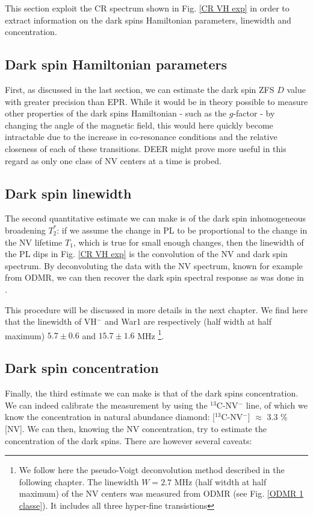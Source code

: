 \documentclass[a4paper, 11pt]{report}
\begin{document}
This section exploit the CR spectrum shown in Fig. \ref{CR VH exp} in order to extract information on the dark spins Hamiltonian parameters, linewidth and concentration.

\subsection{Dark spin Hamiltonian parameters}

First, as discussed in the last section, we can estimate the dark spin ZFS $D$ value with greater precision than EPR. While it would be in theory possible to measure other properties of the dark spins Hamiltonian - such as the $g$-factor - by changing the angle of the magnetic field, this would here quickly become intractable due to the increase in co-resonance conditions and the relative closeness of each of these transitions. DEER might prove more useful in this regard as only one class of NV centers at a time is probed.

\subsection{Dark spin linewidth}

The second quantitative estimate we can make is of the dark spin inhomogeneous broadening $T_2^*$: if we assume the change in PL to be proportional to the change in the NV lifetime $T_1$, which is true for small enough changes, then the linewidth of the PL dips in Fig. \ref{CR VH exp} is the convolution of the NV and dark spin spectrum. By deconvoluting the data with the NV spectrum, known for example from ODMR, we can then recover the dark spin spectral response as was done in \citep{hall2016detection}. 

This procedure will be discussed in more details in the next chapter. We find here that the linewidth of VH$^-$ and War1 are respectively (half width at half maximum) $5.7\pm 0.6$ and $15.7\pm 1.6$ MHz \footnote{We follow here the pseudo-Voigt deconvolution method described in the following chapter. The linewidth $W=2.7$ MHz (half witdth at half maximum) of the NV centers was measured from ODMR (see Fig. \ref{ODMR 1 classe}). It includes all three hyper-fine transistions}.

\subsection{Dark spin concentration}

Finally, the third estimate we can make is that of the dark spins concentration. We can indeed calibrate the measurement by using the $^{13}$C-NV$^-$ line, of which we know the concentration in natural abundance diamond: [$^{13}$C-NV$^-$] $\approx$ 3.3 \% [NV]. We can then, knowing the NV concentration, try to estimate the concentration of the dark spins. There are however several caveats:
\end{document}

